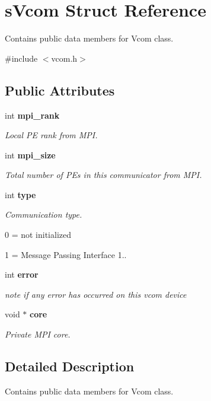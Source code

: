 \section{s\-Vcom Struct Reference}
\label{a00001}


Contains public data members for Vcom class.  




{\ttfamily \#include $<$vcom.\-h$>$}

\subsection*{Public Attributes}
\begin{DoxyCompactItemize}
\item 
int {\bf mpi\-\_\-rank}
\begin{DoxyCompactList}\small\item\em Local P\-E rank from M\-P\-I. \end{DoxyCompactList}\item 
int {\bf mpi\-\_\-size}
\begin{DoxyCompactList}\small\item\em Total number of P\-Es in this communicator from M\-P\-I. \end{DoxyCompactList}\item 
int {\bf type}
\begin{DoxyCompactList}\small\item\em Communication type. \par
 0 = not initialized \par
 1 = Message Passing Interface 1.. \end{DoxyCompactList}\item 
int {\bf error}
\begin{DoxyCompactList}\small\item\em note if any error has occurred on this vcom device \end{DoxyCompactList}\item 
void $\ast$ {\bf core}
\begin{DoxyCompactList}\small\item\em Private M\-P\-I core. \end{DoxyCompactList}\end{DoxyCompactItemize}


\subsection{Detailed Description}
Contains public data members for Vcom class. 


